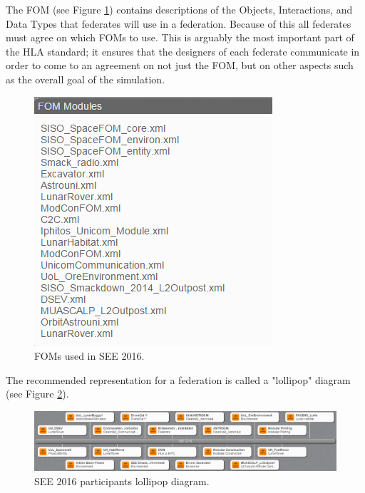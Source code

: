 \documentclass[conference]{IEEEtran}
\begin{document}
		The FOM (see Figure \ref{fom}) contains descriptions of the Objects, Interactions, and Data Types that federates will use in a federation. Because of this all federates must agree on which FOMs to use. This is arguably the most important part of the HLA standard; it ensures that the designers of each federate communicate in order to come to an agreement on not just the FOM, but on other aspects such as the overall goal of the simulation.
\begin{figure}[!htbp]
	\centering
		\includegraphics[width=\linewidth]{fom.png}
		\caption{FOMs used in SEE 2016.}
	\label{fom}
\end{figure}		
		
The recommended representation for a federation is called a "lollipop" diagram (see Figure \ref{lollipop}). 
\begin{figure}[!htbp]
	\centering
		\includegraphics[width=\linewidth]{lollipop.png}
		\caption{SEE 2016 participants lollipop diagram.}
	\label{lollipop}
\end{figure}		
\end{document}
